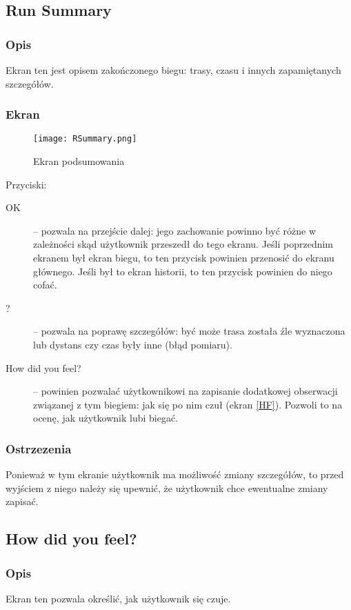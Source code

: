 \subsection{Run Summary}
\subsubsection{Opis}
\noindent Ekran ten jest opisem zakończonego biegu: trasy, czasu i innych zapamiętanych szczegółów.
\subsubsection{Ekran}
\begin{figure}[b!]
  \texttt{[image: RSummary.png]}
  \caption{Ekran podsumowania}
  \label{RS}
\end{figure}
Przyciski:\\
\begin{description}
  \item[OK] -- pozwala na przejście dalej: jego zachowanie powinno być różne w zależności skąd użytkownik przeszedł do tego ekranu. Jeśli poprzednim ekranem był ekran biegu, to ten przycisk powinien przenosić do ekranu głównego. Jeśli był to ekran historii, to ten przycisk powinien do niego cofać.
  \item[?] -- pozwala na poprawę szczegółów: być może trasa została źle wyznaczona lub dystans czy czas były inne (błąd pomiaru).
  \item[How did you feel?] -- powinien pozwalać użytkownikowi na zapisanie dodatkowej obserwacji związanej z tym biegiem: jak się po nim czuł (ekran \ref{HF}). Pozwoli to na ocenę, jak użytkownik lubi biegać.
\end{description}
\subsubsection{Ostrzezenia}
\noindent Ponieważ w tym ekranie użytkownik ma możliwość zmiany szczegółów, to przed wyjściem z niego należy się upewnić, że użytkownik chce ewentualne zmiany zapisać.
\subsection{How did you feel?}
\subsubsection{Opis}
\noindent Ekran ten pozwala określić, jak użytkownik się czuje.
